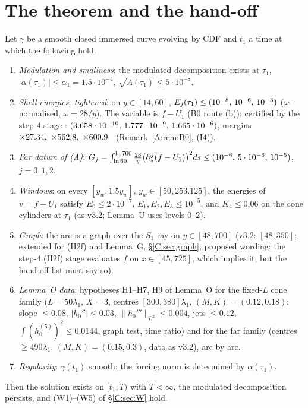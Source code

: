 \documentclass[11pt]{article}
\begin{document}
\section{The theorem and the hand-off}\label{M:sec:thm}
\begin{theorem}\label{M:thm:W}
Let $\gamma$ be a smooth closed immersed curve evolving by CDF and $t_1$ a time at which the following hold.
\begin{enumerate}[label=\textup{(H\arabic*)},leftmargin=*]
\item \emph{Modulation and smallness}: the modulated decomposition exists at $\tau_1$, $|\alpha(\tau_1)|\le\alpha_1=1.5\cdot10^{-4}$, $\sqrt{\Lambda(\tau_1)}\le5\cdot10^{-8}$.
\item \emph{Shell energies, tightened}: on $y\in[14,60]$, $E_j(\tau_1)\le(10^{-8},\,10^{-6},\,10^{-3})$ ($\omega$-normalised, $\omega=28/y$).
The variable is $f-U_1$ (B0 route (b)); certified by the step-4 stage : $(3.658\cdot10^{-10},\,1.777\cdot10^{-9},\,1.665\cdot10^{-6})$, margins $\times27.34,\ \times562.8,\ \times600.9$ \tC\ (Remark~\ref{A:rem:B0}, (I4)).
\item[\textup{(H2f)}] \emph{Far datum of (A)}: $G_j=\int_{\ln60}^{\ln700}\frac{28}y\bigl(\partial_s^j(f-U_1)\bigr)^2ds\le(10^{-6},\,5\cdot10^{-6},\,10^{-5})$, $j=0,1,2$.
\item[\textup{(H3)}] \emph{Windows}: on every $[y_w,1.5y_w]$, $y_w\in[50,253.125]$, the energies of $v=f-U_1$ satisfy $E_0\le2\cdot10^{-7}$, $E_1,E_2,E_3\le10^{-5}$, and $K_4\le0.06$ on the cone cylinders at $\tau_1$ (as v3.2; Lemma~U uses levels $0$--$2$).
\item[\textup{(H4)}] \emph{Graph}: the arc is a graph over the $S_1$ ray on $y\in[48,700]$ (v3.2: $[48,350]$; extended for (H2f) and Lemma~G, \S\ref{C:sec:graph}; proposed wording: the step-4 (H2f) stage evaluates $f$ on $x\in[45,725]$, which implies it, but the hand-off list must say so).
\item[\textup{(H5)}] \emph{Lemma~O data}: hypotheses H1--H7, H9 of Lemma~O for the fixed-$L$ cone family ($L=50\lambda_1$, $X=3$, centres $[300,380]\lambda_1$, $(M,K)=(0.12,0.18)$: slope $\le0.08$, $|h_0''|\le0.03$, $\|h_0'''\|_{L^2}\le0.004$, jets $\le0.12$, $\int(h_0^{(5)})^2\le0.0144$, graph test, time ratio) and for the far family (centres $\ge490\lambda_1$, $(M,K)=(0.15,0.3)$, data as v3.2), arc by arc.
\item[\textup{(H6)}] \emph{Regularity}: $\gamma(t_1)$ smooth; the forcing norm is determined by $\alpha(\tau_1)$.
\end{enumerate}
Then the solution exists on $[t_1,T)$ with $T<\infty$, the modulated decomposition persists, and (W1)--(W5) of \S\ref{C:sec:W} hold.
\end{theorem}
\end{document}
